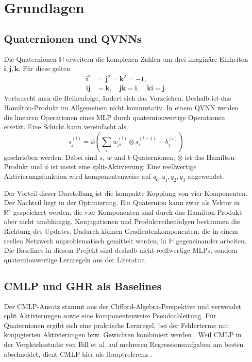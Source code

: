\section{Grundlagen}

\subsection{Quaternionen und QVNNs}

Die Quaternionen $\mathbb{H}$ erweitern die komplexen Zahlen um drei imaginäre Einheiten $\mathbf{i},\mathbf{j},\mathbf{k}$. Für diese gelten
\[
\begin{aligned}
\mathbf{i}^2&=\mathbf{j}^2=\mathbf{k}^2=-1,\\
\mathbf{i}\mathbf{j}&=\mathbf{k},\quad
\mathbf{j}\mathbf{k}=\mathbf{i},\quad
\mathbf{k}\mathbf{i}=\mathbf{j}.
\end{aligned}
\]
Vertauscht man die Reihenfolge, ändert sich das Vorzeichen. Deshalb ist das Hamilton-Produkt im Allgemeinen nicht kommutativ. In einem QVNN werden die linearen Operationen eines MLP durch quaternionwertige Operationen ersetzt. Eine Schicht kann vereinfacht als
\[
s_j^{(l)} = \phi\left(\sum_i w_{ji}^{(l)} \otimes s_i^{(l-1)} + b_j^{(l)}\right)
\]
geschrieben werden. Dabei sind $s$, $w$ und $b$ Quaternionen, $\otimes$ ist das Hamilton-Produkt und $\phi$ ist meist eine split-Aktivierung: Eine reellwertige Aktivierungsfunktion wird komponentenweise auf $q_0,q_1,q_2,q_3$ angewendet.

Der Vorteil dieser Darstellung ist die kompakte Kopplung von vier Komponenten. Der Nachteil liegt in der Optimierung. Ein Quaternion kann zwar als Vektor in $\mathbb{R}^4$ gespeichert werden, die vier Komponenten sind durch das Hamilton-Produkt aber nicht unabhängig. Konjugationen und Produktreihenfolgen bestimmen die Richtung des Updates. Dadurch können Gradientenkomponenten, die in einem reellen Netzwerk unproblematisch gemittelt werden, in $\mathbb{H}$ gegeneinander arbeiten. Die Baselines in diesem Projekt sind deshalb nicht reellwertige MLPs, sondern quaternionwertige Lernregeln aus der Literatur.

\subsection{CMLP und GHR als Baselines}

Der CMLP-Ansatz stammt aus der Clifford-Algebra-Perspektive und verwendet split Aktivierungen sowie eine komponentenweise Pseudoableitung. Für Quaternionen ergibt sich eine praktische Lernregel, bei der Fehlerterme mit konjugierten Aktivierungen bzw. Gewichten kombiniert werden \cite{buchholz2008cmlp,bill2023comparison}. Weil CMLP in der Vergleichsstudie von Bill et al. auf mehreren Regressionsaufgaben am besten abschneidet, dient CMLP hier als Hauptreferenz \cite{bill2023comparison}.

